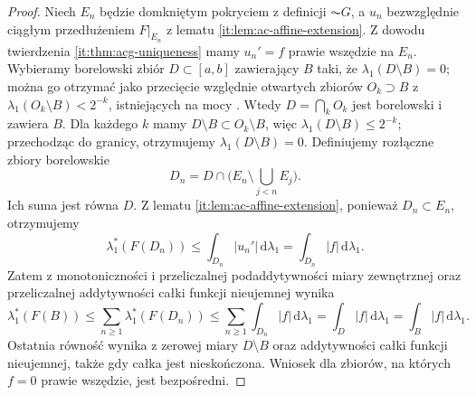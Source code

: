 \begin{proof}
Niech $E_n$ będzie domkniętym pokryciem z definicji
$\AC G$, a $u_n$ bezwzględnie ciągłym przedłużeniem
$F|_{E_n}$ z lematu \ref{it:lem:ac-affine-extension}.
Z dowodu twierdzenia \ref{it:thm:acg-uniqueness} mamy
$u_n'=f$ prawie wszędzie na $E_n$.
Wybieramy borelowski zbiór $D\subset[a,b]$ zawierający $B$ taki, że
$\lambda_1(D\setminus B)=0$; można go otrzymać jako przecięcie względnie otwartych
zbiorów $O_k\supset B$ z $\lambda_1(O_k\setminus B)<2^{-k}$,
istniejących na mocy .
Wtedy $D=\bigcap_k O_k$ jest borelowski i zawiera $B$.
Dla każdego $k$ mamy $D\setminus B\subset O_k\setminus B$,
więc $\lambda_1(D\setminus B)\le2^{-k}$; przechodząc do granicy,
otrzymujemy $\lambda_1(D\setminus B)=0$. Definiujemy rozłączne
zbiory borelowskie
\[
 D_n=D\cap\bigl(E_n\setminus\bigcup_{j<n}E_j\bigr).
\]
Ich suma jest równa $D$. Z lematu
\ref{it:lem:ac-affine-extension}, ponieważ $D_n\subset E_n$,
otrzymujemy
\[
 \lambda_1^*(F(D_n))
 \le\int_{D_n}|u_n'|\,\mathrm d\lambda_1
 =\int_{D_n}|f|\,\mathrm d\lambda_1.
\]
Zatem z monotoniczności i przeliczalnej podaddytywności
miary zewnętrznej oraz przeliczalnej addytywności całki
funkcji nieujemnej wynika
\[
 \lambda_1^*(F(B))
 \le\sum_{n\ge1}\lambda_1^*(F(D_n))
 \le\sum_{n\ge1}\int_{D_n}|f|\,\mathrm d\lambda_1
 =\int_D|f|\,\mathrm d\lambda_1
 =\int_B|f|\,\mathrm d\lambda_1.
\]
Ostatnia równość wynika z zerowej miary $D\setminus B$
oraz addytywności całki funkcji nieujemnej, także gdy całka jest nieskończona.
Wniosek dla zbiorów, na których $f=0$ prawie wszędzie,
jest bezpośredni.
\end{proof}

